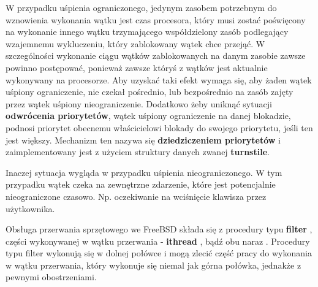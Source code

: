 \documentclass[shortabstract,inz]{iithesis}
\begin{document}
W przypadku uśpienia ograniczonego, jedynym zasobem potrzebnym do wznowienia wykonania wątku jest
czas procesora, który musi zostać poświęcony na wykonanie innego wątku trzymającego 
współdzielony zasób podlegający wzajemnemu wykluczeniu, który zablokowany wątek chce przejąć.
W szczególności wykonanie ciągu wątków zablokowanych na danym zasobie zawsze
powinno postępować, ponieważ zawsze któryś z wątków jest aktualnie wykonywany na procesorze.
Aby uzyskać taki efekt wymaga się, aby żaden wątek uśpiony ograniczenie, nie czekał
pośrednio, lub bezpośrednio na zasób zajęty przez wątek uśpiony nieograniczenie.
Dodatkowo żeby uniknąć sytuacji \textbf{odwrócenia priorytetów}, wątek uśpiony ograniczenie 
na danej blokadzie, podnosi priorytet obecnemu właścicielowi blokady do swojego 
priorytetu, jeśli ten jest większy.
Mechanizm ten nazywa się \textbf{dziedziczeniem priorytetów} i zaimplementowany 
jest z użyciem struktury danych zwanej \textbf{turnstile}.



Inaczej sytuacja wygląda w przypadku uśpienia nieograniczonego. W tym przypadku wątek
czeka na zewnętrzne zdarzenie, które jest potencjalnie nieograniczone czasowo.
Np. oczekiwanie na wciśnięcie klawisza przez użytkownika.

Obsługa przerwania sprzętowego we FreeBSD składa się z procedury typu \textbf{filter} \cite{man:bus_setup_intr_9},
części wykonywanej w wątku przerwania - \textbf{ithread} \cite{man:ithread_9}\cite{bsd:smp_design}, bądź obu naraz \cite{mailing_list}.
Procedury typu filter wykonują się w dolnej połówce i
mogą zlecić część pracy do wykonania w wątku przerwania, który wykonuje się niemal
jak górna połówka, jednakże z pewnymi obostrzeniami.

\end{document}

